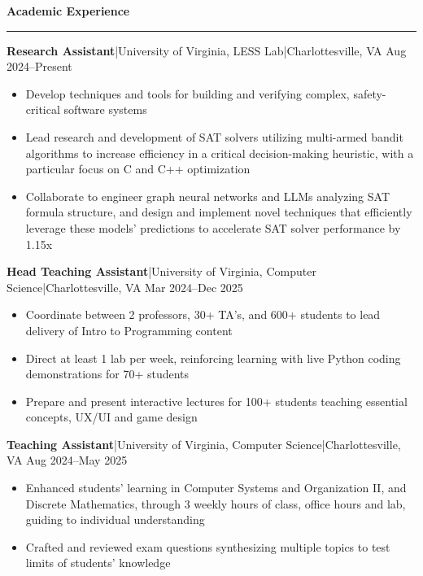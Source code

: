 \documentclass[11pt,letterpaper]{article}
\newcommand{\horibar}[2]{#1\hspace{5pt}|\hspace{5pt}#2}
\newcommand{\sep}[1]{\par\vspace{#1}}
\renewenvironment{section}[1]{
\sep{11pt}
{
\fontsize{14}{2}
\selectfont
\textbf{#1}\\[0.5pt]
}
\sep{4pt}
\noindent\rule{\linewidth}{0.5pt}
\sep{4pt}
}
{
}
\renewenvironment{subsection}[3]
{
\sep{4pt}
\horibar{\textbf{#1}}{#2} \hfill #3
\par\setstretch{1}
\begin{itemize}
}
{
\end{itemize}
\setstretch{0}
}
\begin{document}
\begin{section}{Academic Experience}
    \begin{subsection}{Research Assistant}{\horibar{University of Virginia, LESS Lab}{Charlottesville, VA}}{Aug 2024–Present}
        \item Develop techniques and tools for building and verifying complex, safety-critical software systems 
        \item Lead research and development of SAT solvers utilizing multi-armed bandit algorithms to increase efficiency in a critical decision-making heuristic, with a particular focus on C and C++ optimization
        \item Collaborate to engineer graph neural networks and LLMs analyzing SAT formula structure, and design and implement novel techniques that efficiently leverage these models' predictions to accelerate SAT solver performance by 1.15x
    \end{subsection}
    \begin{subsection}{Head Teaching Assistant}{\horibar{University of Virginia, Computer Science}{Charlottesville, VA}}{Mar 2024–Dec 2025}
        \item Coordinate between 2 professors, 30+ TA's, and 600+ students to lead delivery of Intro to Programming content
        \item Direct at least 1 lab per week, reinforcing learning with live Python coding demonstrations for 70+ students
        \item Prepare and present interactive lectures for 100+ students teaching essential concepts, UX/UI and game design
    \end{subsection}
    \begin{subsection}{Teaching Assistant}{\horibar{University of Virginia, Computer Science}{Charlottesville, VA}}{Aug 2024–May 2025}
        \item Enhanced students’ learning in Computer Systems and Organization II, and Discrete Mathematics, through 3 weekly hours of class, office hours and lab, guiding to individual understanding
        \item Crafted and reviewed exam questions synthesizing multiple topics to test limits of students’ knowledge
    \end{subsection}
\end{section}
\end{document}

